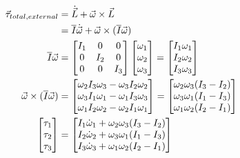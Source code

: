 \documentclass[10pt]{article}
\begin{document}
\begin{align}
    \vec{\tau}_{total,external} &= \dot{\vec{L}} + \vec{\omega}\times\vec{L} 
        \notag\\
    &= \overline{I}\dot{\vec{\omega}} + \vec{\omega}\times
        (\overline{I}\vec{\omega}) \notag\\
    \overline{I}\vec{\omega} &= 
        \begin{bmatrix}
            I_1 & 0 & 0 \\
            0 & I_2 & 0 \\
            0 & 0 & I_3
        \end{bmatrix} 
        \begin{bmatrix}
            \omega_1 \\
            \omega_2 \\
            \omega_3
        \end{bmatrix} 
        = 
        \begin{bmatrix}
            I_1\omega_1 \\
            I_2\omega_2 \\
            I_3\omega_3
        \end{bmatrix}\notag\\
   \vec{\omega}\times(\overline{I}\vec{\omega})
        &= 
        \begin{bmatrix}
            \omega_2I_3\omega_3 
            -\omega_3I_2\omega_2 \\
            \omega_3I_1\omega_1
            -\omega_1I_3\omega_3 \\
            \omega_1I_2\omega_2
            -\omega_2I_1\omega_1
        \end{bmatrix} 
        = 
        \begin{bmatrix}
            \omega_2\omega_3(I_3 - I_2) \\
            \omega_3\omega_1(I_1 - I_3) \\
            \omega_1\omega_2(I_2 - I_1)
        \end{bmatrix} 
        \notag\\
    \begin{bmatrix}
        \tau_1 \\
        \tau_2 \\
        \tau_3
    \end{bmatrix}
        &=
        \begin{bmatrix}
            I_1\dot{\omega}_1 
            +\omega_2\omega_3(I_3 - I_2) \\
            I_2\dot{\omega}_2
            +\omega_3\omega_1(I_1 - I_3) \\
            I_3\dot{\omega}_3
            +\omega_1\omega_2(I_2 - I_1)
        \end{bmatrix}
\end{align}
\end{document}
